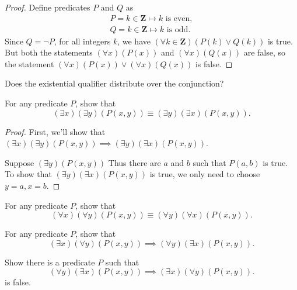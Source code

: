 \documentclass[12pt,fleqn,answers]{exam}
\newcommand{\integers}{\mathbf{Z}}
\begin{document}
\begin{questions}
\begin{proof} Define predicates $P$ and $Q$ as
  \begin{align*}
    P = k \in \integers \mapsto k \mbox{ is even}, \\
    Q = k \in \integers \mapsto k \mbox{ is odd}.
  \end{align*}
Since $Q = \lnot P$, for all integers $k$, we have 
$ \left(\forall k \in \integers \right) \left(P(k) \lor Q(k) \right) $
is true.  But both the statements $ \left(\forall x \right) (P(x))$
and $\left(\forall x \right) (Q(x))$ are false, so the statement 
$\left(\forall x \right) (P(x)) \lor 
\left(\forall x \right) (Q(x))$ is false.
\end{proof}

\question Does the existential qualifier distribute over the 
conjunction?

\question For any predicate $P$, show that
\begin{equation*}
  \left(\exists x\right)
  \left(\exists y \right)
  \left(P(x,y)\right) \equiv
  \left(\exists y \right)
  \left(\exists x \right)
  \left(P(x,y)\right).
\end{equation*}

\begin{proof} First, we'll show that $\left(\exists x\right)
  \left(\exists y \right)
  \left(P(x,y)\right) \implies
  \left(\exists y \right)
  \left(\exists x \right)
  \left(P(x,y)\right)$.
  
  Suppose $\left(\exists y \right) \left(P(x,y)\right)$ Thus there 
  are $a$ and $b$ such that $P(a,b)$ is true. To show that 
  $ \left(\exists y \right)
  \left(\exists x \right)
  \left(P(x,y)\right)$ is true, we only need to choose $y=a,x=b$.
  



\end{proof}

\question For any predicate $P$, show that
\begin{equation*}
  \left(\forall x\right)
  \left(\forall y \right)
  \left(P(x,y)\right) \equiv
  \left(\forall y \right)
  \left(\forall x \right)
  \left(P(x,y)\right).
\end{equation*}


\question For any predicate $P$, show that
\begin{equation*}
    \left(\exists x\right)
    \left(\forall y \right)
    \left(P(x,y)\right) \implies 
    \left(\forall y \right)
    \left(\exists x \right)
    \left(P(x,y)\right).
  \end{equation*}

  \question Show there is a predicate $P$ such that 
  \begin{equation*}
    \left(\forall y \right)
    \left(\exists x \right)
    \left(P(x,y)\right) \implies 
      \left(\exists x\right)
      \left(\forall y \right)
      \left(P(x,y)\right).
\end{equation*}
is false.
  


\end{questions}
\end{document}
